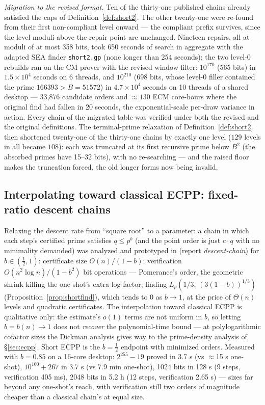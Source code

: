 \documentclass[11pt]{amsart}
\newcommand{\Lp}[2]{L_{p}\!\left(#1,\,#2\right)}
\newcommand{\osf}{\cite{OSF}}
\theoremstyle{plain}
\theoremstyle{definition}
\theoremstyle{remark}
\begin{document}
\emph{Migration to the revised format.}  Ten of the thirty-one published chains already satisfied
the caps of Definition~\ref{def:short2}.  The other twenty-one were re-found from their first
non-compliant level onward --- the compliant prefix survives, since the level moduli above the
repair point are unchanged.  Nineteen repairs, all at moduli of at most 358 bits, took 650 seconds
of search in aggregate with the adapted SEA finder \texttt{short2.gp} \osf{} (none longer than 254
seconds); the two level-0 rebuilds ran on the CM prover with the revised window filter:
$10^{170}$ (565 bits) in $1.5\times 10^4$ seconds on 6 threads, and $10^{210}$ (698 bits, whose
level-0 filler contained the prime $166393 > B = 51572$) in $4.7\times 10^4$ seconds on 10 threads
of a shared desktop --- 33{,}876 candidate orders and ${\approx}130$ ECM core-hours where the
original find had fallen in 20 seconds, the exponential-scale per-draw variance in action.  Every
chain of the migrated table was verified under both the revised and the original definitions.
The terminal-prime relaxation of Definition~\ref{def:short2} then shortened twenty-one of the
thirty-one chains by exactly one level ($129$ levels in all became $108$): each was truncated at
its first recursive prime below $B^2$ (the absorbed primes have 15--32 bits), with no re-searching
--- and the raised floor makes the truncation forced, the old longer forms now being invalid.

\subsection{Interpolating toward classical ECPP: fixed-ratio descent chains}\label{sec:bdescent}

Relaxing the descent rate from ``square root'' to a parameter: a chain in which each step's certified
prime satisfies $q \le p^b$ (and the point order is just $c\cdot q$ with no minimality demanded) was
analyzed and prototyped in \osf{} (report \emph{descent-chain}) for $b \in (\tfrac12, 1)$: certificate
size $O(n)/(1-b)$; verification $O(n^2\log n)/(1-b^2)$ bit operations --- Pomerance's order, the
geometric shrink killing the one-shot's extra log factor; finding
$\Lp{1/3}{(3(1-b))^{1/3}}$ (Proposition~\ref{prop:shortfind}), which tends to $0$ as
$b \to 1$, at the price of $\Theta(n)$ levels and quadratic certificates.  The interpolation toward
classical ECPP is qualitative only: the estimate's $o(1)$ terms are not uniform in $b$, so letting
$b = b(n) \to 1$ does not \emph{recover} the polynomial-time bound --- at polylogarithmic cofactor
sizes the Dickman analysis gives way to the prime-density analysis of \S\ref{sec:ecpp}.  Short ECPP
is the $b = \tfrac12$ endpoint with minimized orders.  Measured with $b = 0.85$ on a 16-core desktop:
$2^{255}-19$ proved in 3.7 s (vs ${\approx}$15 s one-shot), $10^{100}+267$ in 3.7 s (vs 7.9 min
one-shot), 1024 bits in 128 s (9 steps, verification 405 ms), 2048 bits in 5.2 h (12 steps,
verification 2.65 s) --- sizes far beyond any one-shot's reach, with verification still two orders of
magnitude cheaper than a classical chain's at equal size.
\end{document}
